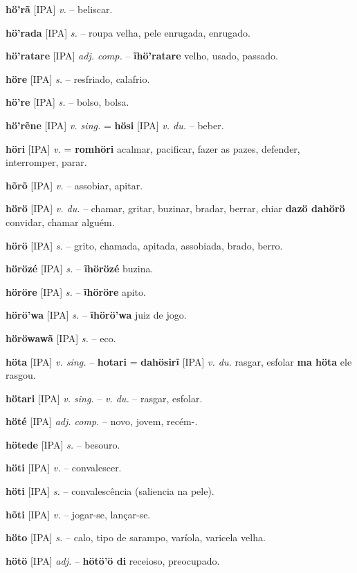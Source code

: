 \textbf{hö'rã} [IPA] \textit{v.} -- beliscar.

\textbf{hö'rada} [IPA] \textit{s.} -- roupa velha, pele enrugada, enrugado.

\textbf{hö'ratare} [IPA] \textit{adj. comp.} -- \textbf{ĩhö'ratare} velho, usado, passado.

\textbf{höre} [IPA] \textit{s.} -- resfriado, calafrio.

\textbf{hö're} [IPA] \textit{s.} -- bolso, bolsa.

\textbf{hö'rẽne} [IPA] \textit{v. sing.} = \textbf{hösi} [IPA] \textit{v. du.} -- beber.

\textbf{höri} [IPA] \textit{v.} = \textbf{romhöri} acalmar, pacificar, fazer as pazes, defender, interromper, parar.

\textbf{hõrõ} [IPA] \textit{v.} -- assobiar, apitar.

\textbf{hörö} [IPA] \textit{v. du.} -- chamar, gritar, buzinar, bradar, berrar, chiar  \textbf{dazö dahörö} convidar, chamar alguém.

\textbf{hörö} [IPA] \textit{s.} -- grito, chamada, apitada, assobiada, brado, berro.

\textbf{hörözé} [IPA] \textit{s.} -- \textbf{ĩhörözé} buzina.

\textbf{höröre} [IPA] \textit{s.} -- \textbf{ĩhöröre} apito.

\textbf{hörö'wa} [IPA] \textit{s.} -- \textbf{ĩhörö'wa} juiz de jogo.

\textbf{höröwawã} [IPA] \textit{s.} -- eco.

\textbf{höta} [IPA] \textit{v. sing.} -- \textbf{hotari} = \textbf{dahösirĩ} [IPA] \textit{v. du.} rasgar, esfolar  \textbf{ma höta} ele rasgou.

\textbf{hötari} [IPA] \textit{v. sing.} -- \textit{v. du.} -- rasgar, esfolar.

\textbf{höté} [IPA] \textit{adj. comp.} -- novo, jovem, recém-.

\textbf{hötede} [IPA] \textit{s.} -- besouro.

\textbf{höti} [IPA] \textit{v.} -- convalescer.

\textbf{höti} [IPA] \textit{s.} -- convalescência (saliencia na pele).

\textbf{hõti} [IPA] \textit{v.} -- jogar-se, lançar-se.

\textbf{höto} [IPA] \textit{s.} -- calo, tipo de sarampo, varíola, varicela velha.

\textbf{hötö} [IPA] \textit{adj.} -- \textbf{hötö'ö di} receioso, preocupado.

